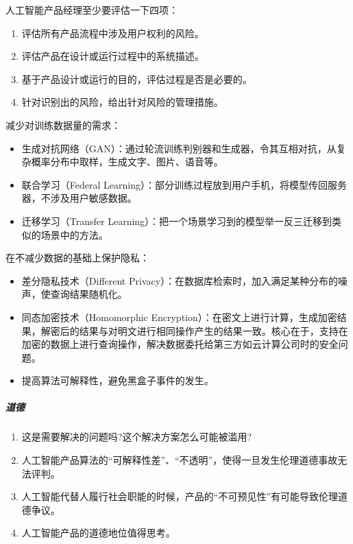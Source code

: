 \documentclass[letterpaper,11pt,english]{sphinxmanual}
\begin{document}
人工智能产品经理至少要评估一下四项：
\begin{enumerate}
%
\item {} 
评估所有产品流程中涉及用户权利的风险。

\item {} 
评估产品在设计或运行过程中的系统描述。

\item {} 
基于产品设计或运行的目的，评估过程是否是必要的。

\item {} 
针对识别出的风险，给出针对风险的管理措施。

\end{enumerate}

减少对训练数据量的需求：
\begin{itemize}
\item {} 
生成对抗网络（GAN）：通过轮流训练判别器和生成器，令其互相对抗，从复杂概率分布中取样，生成文字、图片、语音等。

\item {} 
联合学习（Federal
Learning）：部分训练过程放到用户手机，将模型传回服务器，不涉及用户敏感数据。

\item {} 
迁移学习（Transfer
Learning）：把一个场景学习到的模型举一反三迁移到类似的场景中的方法。

\end{itemize}

在不减少数据的基础上保护隐私：
\begin{itemize}
\item {} 
差分隐私技术（Different
Privacy）：在数据库检索时，加入满足某种分布的噪声，使查询结果随机化。

\item {} 
同态加密技术（Homomorphic
Encryption）：在密文上进行计算，生成加密结果，解密后的结果与对明文进行相同操作产生的结果一致。核心在于，支持在加密的数据上进行查询操作，解决数据委托给第三方如云计算公司时的安全问题。

\item {} 
提高算法可解释性，避免黑盒子事件的发生。

\end{itemize}


\subparagraph{道德}
\label{\detokenize{chapter_introduction/AI_PM:id39}}\begin{enumerate}
%
\item {} 
这是需要解决的问题吗?这个解决方案怎么可能被滥用?

\item {} 
人工智能产品算法的“可解释性差”、“不透明”，使得一旦发生伦理道德事故无法评判。

\item {} 
人工智能代替人履行社会职能的时候，产品的“不可预见性”有可能导致伦理道德争议。

\item {} 
人工智能产品的道德地位值得思考。

\end{enumerate}
\end{document}
